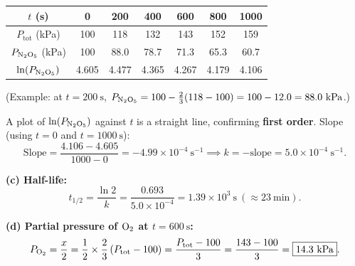\documentclass[11pt]{article}
\begin{document}
\begin{exoresolu}
\begin{center}
\begin{tabular}{|c|cccccc|}\hline
$t$ (s) & 0 & 200 & 400 & 600 & 800 & 1000 \\ \hline
$P_{\text{tot}}$ (kPa) & 100 & 118 & 132 & 143 & 152 & 159 \\ \hline
$P_{\ce{N2O5}}$ (kPa) & 100 & 88.0 & 78.7 & 71.3 & 65.3 & 60.7 \\ \hline
$\ln(P_{\ce{N2O5}})$ & 4.605 & 4.477 & 4.365 & 4.267 & 4.179 & 4.106 \\ \hline
\end{tabular}
\end{center}
(Example: at $t=200\ \mathrm{s}$, $P_{\ce{N2O5}} = 100 - \frac{2}{3}(118-100) = 100 - 12.0 = 88.0\ \mathrm{kPa}$.)

A plot of $\ln(P_{\ce{N2O5}})$ against $t$ is a straight line, confirming \textbf{first order}. Slope (using $t=0$ and $t=1000\ \mathrm{s}$):
\[ \text{Slope} = \frac{4.106 - 4.605}{1000 - 0} = -4.99 \times 10^{-4}\ \mathrm{s^{-1}} \implies k = -\text{slope} = \boxed{5.0 \times 10^{-4}\ \mathrm{s^{-1}}}. \]

\textbf{(c) Half-life:}
\[ t_{1/2} = \frac{\ln 2}{k} = \frac{0.693}{5.0 \times 10^{-4}} = \boxed{1.39 \times 10^{3}\ \mathrm{s}\ (\approx 23\ \mathrm{min})}. \]

\textbf{(d) Partial pressure of $\ce{O2}$ at $t=600\ \mathrm{s}$:}
\[ P_{\ce{O2}} = \frac{x}{2} = \frac{1}{2}\times\frac{2}{3}\left(P_{\text{tot}} - 100\right) = \frac{P_{\text{tot}} - 100}{3} = \frac{143 - 100}{3} = \boxed{14.3\ \mathrm{kPa}}. \]
\end{exoresolu}
\end{document}

